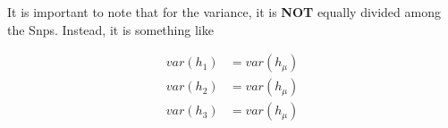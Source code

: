 \documentclass[12pt,a4paper,twoside]{report}
\begin{document}
It is important to note that for the variance, it is \textbf{NOT} equally divided among the Snps. 
Instead, it is something like

\begin{align*}
var(h_1) &= var(h_\mu) \\
var(h_2) &= var(h_\mu) \\
var(h_3) &= var(h_\mu)
\end{align*}
\end{document}
